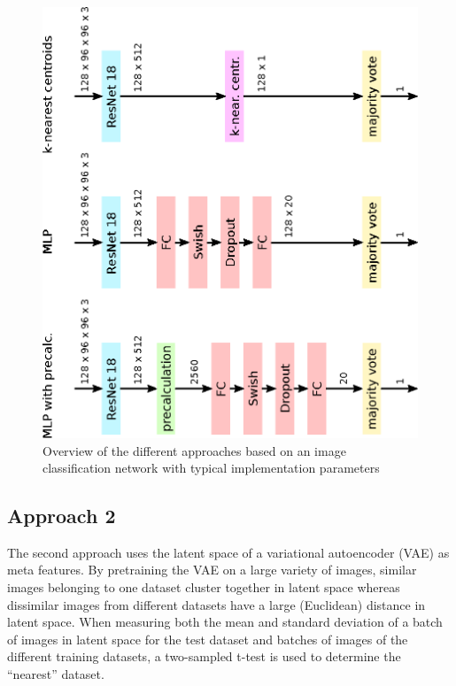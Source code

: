 \documentclass{article}
\begin{document}
%
\begin{figure}[htb]
\begin{center}
 	\includegraphics[width=0.8\linewidth]{../figures/approach1.eps} 
\end{center}
\caption{Overview of the different approaches based on an image classification network with typical implementation parameters}
\label{fig:approach1}
\end{figure} 
%

\subsection{Approach 2}
\label{sec:approach2}

The second approach uses the latent space of a variational autoencoder (VAE) as meta features. By pretraining the VAE on a large variety of images, similar images belonging to one dataset cluster together in latent space whereas dissimilar images from different datasets have a large (Euclidean) distance in latent space. When measuring both the mean and standard deviation of a batch of images in latent space for the test dataset and batches of images of the different training datasets, a two-sampled t-test is used to determine the ``nearest'' dataset. %
\end{document}
